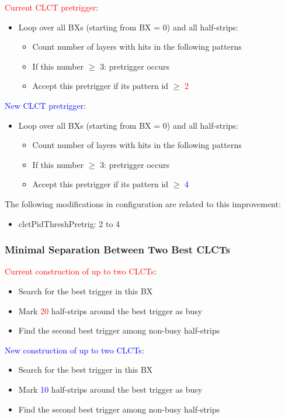 \textcolor{red}{Current CLCT pretrigger}:
\begin{itemize}
    \item Loop over all BXs (starting from BX = 0) and all half-strips:
    \begin{itemize}
        \item Count number of layers with hits in the following patterns
        \item If this number $\geq$ 3: pretrigger occurs
        \item Accept this pretrigger if its pattern id $\geq$ \textcolor{red}{2}
    \end{itemize}
\end{itemize}
\textcolor{blue}{New CLCT pretrigger}:
\begin{itemize}
    \item Loop over all BXs (starting from BX = 0) and all half-strips:
    \begin{itemize}
        \item Count number of layers with hits in the following patterns
        \item If this number $\geq$ 3: pretrigger occurs
        \item Accept this pretrigger if its pattern id $\geq$ \textcolor{blue}{4}
    \end{itemize}
\end{itemize}

The following modifications in configuration are related to this improvement:
\begin{itemize}
    \item clctPidThreshPretrig: 2 to 4
\end{itemize}

\subsubsection{Minimal Separation Between Two Best CLCTs}

\textcolor{red}{Current construction of up to two CLCTs}:
\begin{itemize}
    \item Search for the best trigger in this BX
    \item Mark \textcolor{red}{20} half-strips around the best trigger as busy
    \item Find the second best trigger among non-busy half-strips
\end{itemize}
\textcolor{blue}{New construction of up to two CLCTs}:
\begin{itemize}
    \item Search for the best trigger in this BX
    \item Mark \textcolor{blue}{10} half-strips around the best trigger as busy
    \item Find the second best trigger among non-busy half-strips
\end{itemize}

